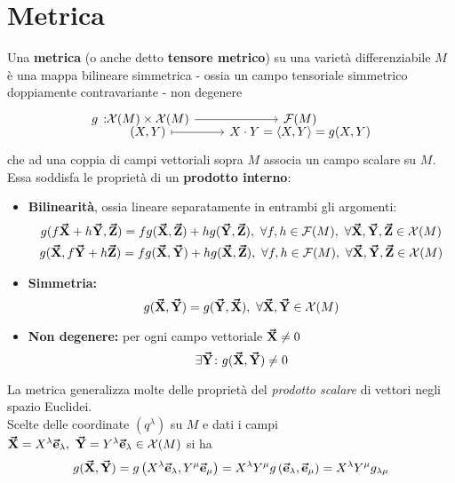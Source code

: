 \section{Metrica}
\begin{define}[Metrica]
	Una \textbf{metrica} (o anche detto \textbf{tensore metrico}) su una varietà differenziabile $M$ è una mappa bilineare simmetrica - ossia un campo tensoriale simmetrico doppiamente contravariante - non degenere
	\begin{equation}
		\funztot[g]{\mathcal{X}(M)\times \mathcal{X}(M)}{\mathcal{F}(M)}{\left(X,Y\right)}{X\cdot Y=\left<X,Y\right>=g(X,Y)}
	\end{equation}
	che ad una coppia di campi vettoriali sopra $M$ associa un campo scalare su $M$. Essa soddisfa le proprietà di un \textbf{prodotto interno}:
	\begin{itemize}
		\item \textbf{Bilinearità}, ossia lineare separatamente in entrambi gli argomenti:
		\begin{gather}
			g(f\vba{X}+h\vba{Y},\vba{Z})=fg(\vba{X},\vba{Z})+hg(\vba{Y},\vba{Z}),\ \forall f,h\in \mathcal{F}(M),\ \forall \vba{X},\vba{Y},\vba{Z}\in\mathcal{X}(M)\\
			g(\vba{X},f\vba{Y}+h\vba{Z})=fg(\vba{X},\vba{Y})+hg(\vba{X},\vba{Z}),\ \forall f,h\in \mathcal{F}(M),\ \forall \vba{X},\vba{Y},\vba{Z}\in\mathcal{X}(M)
		\end{gather}
		\item \textbf{Simmetria:}
		\begin{equation}
			g(\vb*{\va{X}},\vb*{\va{Y}})=g(\vb*{\va{Y}},\vb*{\va{X}}),\ \forall \vb*{\va{X}},\vb*{\va{Y}}\in\mathcal{X}(M)
		\end{equation}
		\item  \textbf{Non degenere:} per ogni campo vettoriale $\vb*{\va{X}}\neq 0$
		\begin{equation}
			\exists \vb*{\va{Y}}\colon g(\vb*{\va{X}},\vb*{\va{Y}})\neq 0
		\end{equation}
	\end{itemize}
\end{define}
La metrica generalizza molte delle proprietà del \textit{prodotto scalare} di vettori negli spazio Euclidei.\\
Scelte delle coordinate $(q^\lambda)$ su $M$ e dati i campi $\vba{X}=X^{\lambda}\vba{e}_{\lambda},\ \vba{Y}=Y^{\lambda}\vba{e}_{\lambda}\in\mathcal{X}(M)$ si ha
\begin{equation*}
	g(\vb*{\va{X}},\vb*{\va{Y}})=g\left(X^\lambda\vb*{\va{e}}_\lambda,Y^\mu\vb*{\va{e}}_\mu\right)=X^\lambda Y^\mu g\left(\vb*{\va{e}}_\lambda,\vb*{\va{e}}_\mu\right)=X^\lambda Y^\mu g_{\lambda \mu}
\end{equation*}
